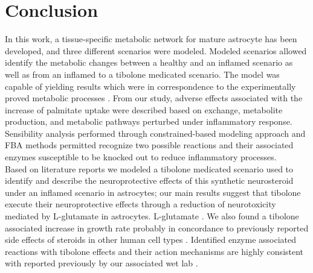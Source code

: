 \section{Conclusion}
In this work, a tissue-specific metabolic network for mature astrocyte has been developed, and three different scenarios were modeled. Modeled scenarios allowed identify the metabolic changes between a healthy and an inflamed scenario as well as from an inflamed to a tibolone medicated scenario. The model was capable of yielding results which were in correspondence to the experimentally proved metabolic processes \cite{Das2010,Liu2013}. From our study, adverse effects associated with the increase of palmitate uptake were described based on exchange, metabolite production, and metabolic pathways perturbed under inflammatory response. Sensibility analysis performed through constrained-based modeling approach and FBA methods permitted recognize two possible reactions and their associated enzymes susceptible to be knocked out to reduce inflammatory processes.\\

Based on literature reports we modeled a tibolone medicated scenario used to identify and describe the neuroprotective effects of this synthetic neurosteroid under an inflamed scenario in astrocytes; our main results suggest that tibolone execute their neuroprotective effects through a reduction of neurotoxicity mediated by L-glutamate in astrocytes. L-glutamate \cite{Petrelli2016}. We also found a tibolone associated increase in growth rate probably in concordance to previously reported side effects of steroids in other human cell types \cite{Colditz1993,Colditz1995}. Identified enzyme associated reactions with tibolone effects and their action mechanisms are highly consistent with reported previously by our associated wet lab \cite{Avila-Rodriguez2014, Avila-Rodriguez2016}. 